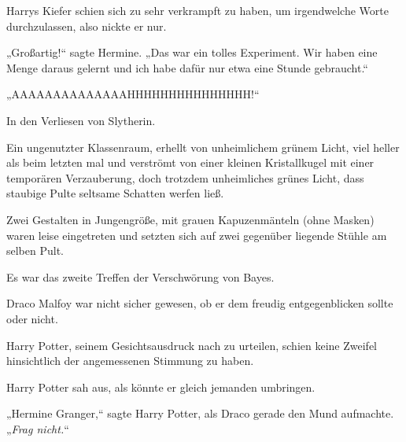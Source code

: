 Harrys Kiefer schien sich zu sehr verkrampft zu haben, um irgendwelche Worte durchzulassen, also nickte er nur.

„Großartig!“ sagte Hermine. „Das war ein tolles Experiment. Wir haben eine Menge daraus gelernt und ich habe dafür nur etwa eine Stunde gebraucht.“

„AAAAAAAAAAAAAAHHHHHHHHHHHHHHH!“

\later

In den Verliesen von Slytherin.

Ein ungenutzter Klassenraum, erhellt von unheimlichem grünem Licht, viel heller als beim letzten mal und verströmt von einer kleinen Kristallkugel mit einer temporären Verzauberung, doch trotzdem unheimliches grünes Licht, dass staubige Pulte seltsame Schatten werfen ließ.

Zwei Gestalten in Jungengröße, mit grauen Kapuzenmänteln (ohne Masken) waren leise eingetreten und setzten sich auf zwei gegenüber liegende Stühle am selben Pult.

Es war das zweite Treffen der Verschwörung von Bayes.

Draco Malfoy war nicht sicher gewesen, ob er dem freudig entgegenblicken sollte oder nicht.

Harry Potter, seinem Gesichtsausdruck nach zu urteilen, schien keine Zweifel hinsichtlich der angemessenen Stimmung zu haben.

Harry Potter sah aus, als könnte er gleich jemanden umbringen.

„Hermine Granger,“ sagte Harry Potter, als Draco gerade den Mund aufmachte. „\emph{Frag nicht.}“

